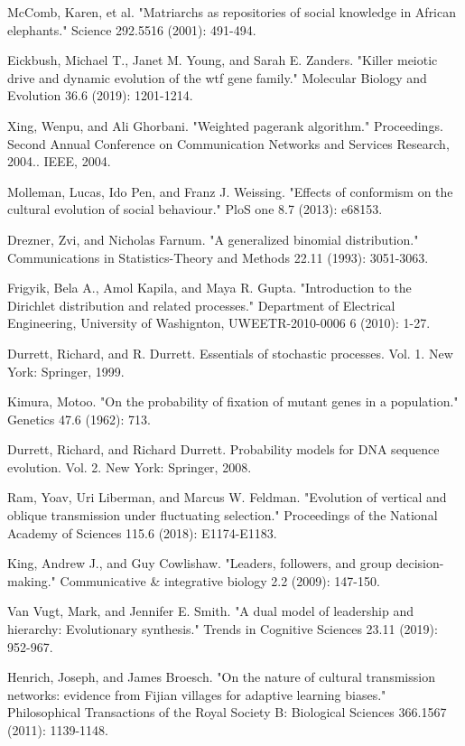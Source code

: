 \documentclass[12pt]{extarticle}
\begin{document}
\begin{thebibliography}{}
McComb, Karen, et al. "Matriarchs as repositories of social knowledge in African elephants." Science 292.5516 (2001): 491-494.

Eickbush, Michael T., Janet M. Young, and Sarah E. Zanders. "Killer meiotic drive and dynamic evolution of the wtf gene family." Molecular Biology and Evolution 36.6 (2019): 1201-1214.

Xing, Wenpu, and Ali Ghorbani. "Weighted pagerank algorithm." Proceedings. Second Annual Conference on Communication Networks and Services Research, 2004.. IEEE, 2004.

Molleman, Lucas, Ido Pen, and Franz J. Weissing. "Effects of conformism on the cultural evolution of social behaviour." PloS one 8.7 (2013): e68153.

Drezner, Zvi, and Nicholas Farnum. "A generalized binomial distribution." Communications in Statistics-Theory and Methods 22.11 (1993): 3051-3063.

Frigyik, Bela A., Amol Kapila, and Maya R. Gupta. "Introduction to the Dirichlet distribution and related processes." Department of Electrical Engineering, University of Washignton, UWEETR-2010-0006 6 (2010): 1-27.

Durrett, Richard, and R. Durrett. Essentials of stochastic processes. Vol. 1. New York: Springer, 1999.

Kimura, Motoo. "On the probability of fixation of mutant genes in a population." Genetics 47.6 (1962): 713.

Durrett, Richard, and Richard Durrett. Probability models for DNA sequence evolution. Vol. 2. New York: Springer, 2008.

Ram, Yoav, Uri Liberman, and Marcus W. Feldman. "Evolution of vertical and oblique transmission under fluctuating selection." Proceedings of the National Academy of Sciences 115.6 (2018): E1174-E1183.

King, Andrew J., and Guy Cowlishaw. "Leaders, followers, and group decision-making." Communicative \& integrative biology 2.2 (2009): 147-150.

Van Vugt, Mark, and Jennifer E. Smith. "A dual model of leadership and hierarchy: Evolutionary synthesis." Trends in Cognitive Sciences 23.11 (2019): 952-967.

Henrich, Joseph, and James Broesch. "On the nature of cultural transmission networks: evidence from Fijian villages for adaptive learning biases." Philosophical Transactions of the Royal Society B: Biological Sciences 366.1567 (2011): 1139-1148.


\end{thebibliography}
\end{document}

